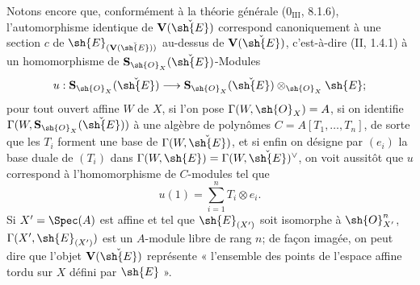 
Notons encore que, conformément à la théorie générale ($0_{\mathrm{III}}$, 8.1.6), l'automorphisme identique de $\mathbf V(\check{\sh{E}})$ correspond canoniquement à une section $c$ de $\sh{E}_{(\mathbf V(\check{\sh{E}}))}$ au-dessus de $\mathbf V(\check{\sh{E}})$, c'est-à-dire (II, 1.4.1) à un homomorphisme de $\mathbf S_{\sh{O}_X}(\check{\sh{E}})$-Modules
\[
  u:\mathbf S_{\sh{O}_X}(\check{\sh{E}})\longrightarrow
  \mathbf S_{\sh{O}_X}(\check{\sh{E}})\otimes_{\sh{O}_X}\sh{E};
\]
pour tout ouvert affine $W$ de $X$, si l'on pose $\Gamma(W,\sh{O}_X)=A$, si on identifie $\Gamma(W,\mathbf S_{\sh{O}_X}(\check{\sh{E}}))$ à une algèbre de polynômes $C=A[T_1,\ldots,T_n]$, de sorte que les $T_i$ forment une base de $\Gamma(W,\check{\sh{E}})$, et si enfin on désigne par $(e_i)$ la base duale de $(T_i)$ dans $\Gamma(W,\sh{E})=\Gamma(W,\check{\sh{E}})^\vee$, on voit aussitôt que $u$ correspond à l'homomorphisme de $C$-modules tel que
\[
  u(1)=\sum_{i=1}^n T_i\otimes e_i.
\]
Si $X'=\Spec(A)$ est affine et tel que $\sh{E}_{(X')}$ soit isomorphe à $\sh{O}_{X'}^n$, $\Gamma(X',\sh{E}_{(X')})$ est un $A$-module libre de rang $n$; de façon imagée, on peut dire que l'objet $\mathbf V(\check{\sh{E}})$ représente « l'ensemble des points de l'espace affine tordu sur $X$ défini par $\sh{E}$ ».


